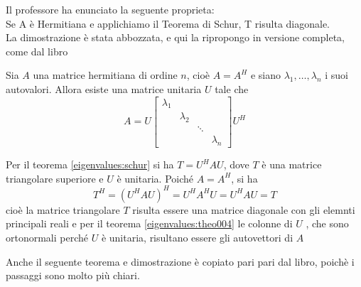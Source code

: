 \begin{notes}
 Il professore ha enunciato la seguente proprieta:\\
Se A \`e Hermitiana e applichiamo il Teorema di Schur, T risulta
diagonale. \\
La dimostrazione \`e stata abbozzata, e qui la ripropongo
in versione completa, come dal libro
\end{notes}
% 
%    
% 
% 

\begin{theo} \label{eigenvalues:theo005}
 Sia $A$ una matrice hermitiana di ordine $n$, cio\`e
$A = A^{H}$ e siano $\lambda_1, \ldots, \lambda_n$ i suoi
autovalori. Allora esiste una matrice unitaria $U$
tale che
$$ A = U
\left[
\begin{array}{cccc}
\lambda_1 & & &  \\
& \lambda_2 & &  \\
 & & \ddots &  \\
 & &  & \lambda_n 
\end{array}
\right]
U^{H}
$$
\end{theo}


\begin{thproof}
Per il teorema \ref{eigenvalues:schur} si ha $T = U^{H}AU$, dove $T$ \`e 
una matrice triangolare superiore e $U$ \`e unitaria. Poich\'e $A =A^{H}$, si ha
$$ T^{H} = (U^{H}AU)^{H} = U^{H}A^{H}U = U^{H}AU = T$$
cio\`e la matrice triangolare $T$ risulta essere una matrice
diagonale con gli elemnti principali reali e per il teorema
\ref{eigenvalues:theo004} le colonne di $U$ , che sono ortonormali perch\'e $U$
\`e unitaria, risultano essere gli autovettori di $A$
\end{thproof}

\begin{notes}
 Anche il seguente teorema e dimostrazione \`e copiato pari pari
dal libro, poich\`e i passaggi sono molto più chiari.
\end{notes}

